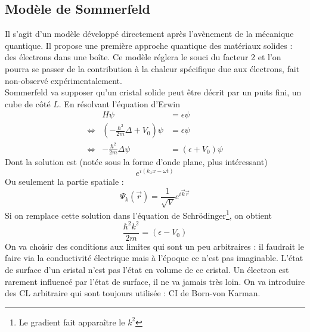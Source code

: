 \subsection{Modèle de Sommerfeld}
Il s'agit d'un modèle développé directement après l'avènement de la 
mécanique quantique. Il propose une première approche quantique des 
matériaux solides : des électrons dans une boîte. Ce modèle réglera 
le souci du facteur 2 et l'on pourra se passer de la contribution à 
la chaleur spécifique due aux électrons, fait non-observé 
expérimentalement.\\


Sommerfeld va supposer qu'un cristal solide peut être décrit par un 
puits fini, un cube de côté $L$.  En résolvant l'équation d'Erwin  
\begin{equation}
	\begin{array}{lll}
		                & H\psi                                            & =  \epsilon\psi      \\
		\Leftrightarrow & \left(-\frac{\hbar^2}{2m}\Delta + V_0\right)\psi & = \epsilon\psi       \\
		\Leftrightarrow & -\frac{\hbar^2}{2m}\Delta \psi                   & = (\epsilon+V_0)\psi 
	\end{array}
\end{equation}
Dont la solution est (notée sous la forme d'onde plane, plus 
intéressant)
\begin{equation}
	e^{i(k_xx-\omega t)}
\end{equation}
Ou seulement la partie spatiale :
\begin{equation}
	\Psi_k(\vec r) = \frac{1}{\sqrt{V}} e^{i\vec k \vec{r}}
\end{equation}
Si on remplace cette solution dans l'équation de Schrödinger\footnote{
Le gradient fait apparaître le $k^2$}, on obtient
\begin{equation}
	\frac{\hbar^2k^2}{2m} = (\epsilon-V_0)
\end{equation}
On va choisir des conditions aux limites qui sont un peu arbitraires :
il faudrait le faire via la conductivité électrique mais à l'époque ce 
n'est pas imaginable. L'état de surface d'un cristal n'est pas 
l'état en volume de ce cristal. Un électron est rarement influencé 
par l'état de surface, il ne va jamais très loin. On va introduire 
des CL arbitraire qui sont toujours utilisée : CI de Born-von Karman.\\

